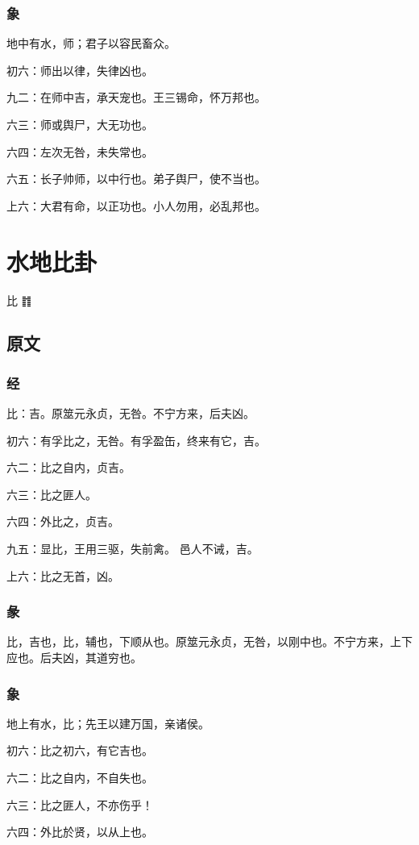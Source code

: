 \documentclass[12pt,oneside]{book}
\begin{document}
\subsection{象}
地中有水，师；君子以容民畜众。

初六：师出以律，失律凶也。

九二：在师中吉，承天宠也。王三锡命，怀万邦也。

六三：师或舆尸，大无功也。

六四：左次无咎，未失常也。

六五：长子帅师，以中行也。弟子舆尸，使不当也。

上六：大君有命，以正功也。小人勿用，必乱邦也。


\chapter{水地比卦}
比 {\Large ䷇}

\section{原文}
\subsection{经}
比：吉。原筮元永贞，无咎。不宁方来，后夫凶。

初六：有孚比之，无咎。有孚盈缶，终来有它，吉。

六二：比之自内，贞吉。

六三：比之匪人。

六四：外比之，贞吉。

九五：显比，王用三驱，失前禽。 邑人不诫，吉。

上六：比之无首，凶。

\subsection{彖}
比，吉也，比，辅也，下顺从也。原筮元永贞，无咎，以刚中也。不宁方来，上下应也。后夫凶，其道穷也。

\subsection{象}
地上有水，比；先王以建万国，亲诸侯。

初六：比之初六，有它吉也。

六二：比之自内，不自失也。

六三：比之匪人，不亦伤乎！

六四：外比於贤，以从上也。
\end{document}
